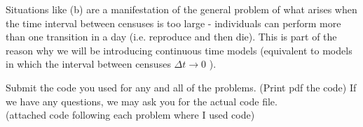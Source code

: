 \documentclass[addpoints, 11pt]{exam}
\begin{document}
\begin{questions}
\begin{parts}
	Situations like (b) are a manifestation of the general problem of what arises when the time interval between censuses is too large - individuals can perform more than one transition in a day (i.e. reproduce and then die). This is part of the reason why we will be introducing continuous time models (equivalent to models in which the interval between censuses $\Delta t \rightarrow 0$ ).	
\end{parts}
\question Submit the code you used for any and all of the problems. (Print pdf the code) If we have any questions, we may ask you for the actual code file.\\
(attached code following each problem where I used code)

\end{questions}
\end{document}
